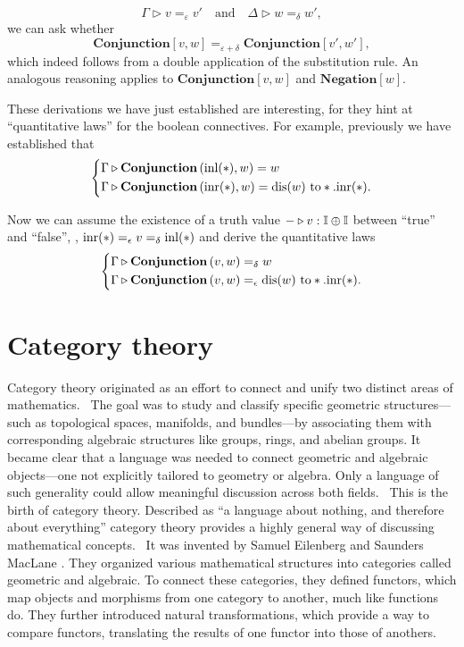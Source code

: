$$ \Gamma \triangleright v =_{\varepsilon} v' \quad \text{and} \quad \Delta \triangleright w =_{\delta} w', $$
we can ask whether
$$ \textbf{Conjunction} [v, w] =_{\varepsilon + \delta}  \textbf{Conjunction} [v', w'], $$
which indeed follows from a double application of the substitution rule. An analogous reasoning applies to $\textbf{Conjunction} [v, w]$ and $\textbf{Negation} [w]$.

These derivations we have just established are interesting, for they hint at ``quantitative laws'' for the boolean connectives. For example, previously we have established that
\[
      \left\{
      \begin{aligned}
      & \Gamma \triangleright \textbf{Conjunction} \, (\mathrm{inl}(*),w) = w  \\
      & \Gamma \triangleright \textbf{Conjunction} \, (\mathrm{inr}(*), w) = \text{dis}(w) \text{ to} *. \mathrm{inr}(*).
      \end{aligned}
      \right.
      \]

Now we can assume the existence of a truth value $- \triangleright v: \mathbb{I} \oplus \mathbb{I}$ between ``true'' and ``false'', \ie,
$\mathrm{inr}(*) =_{\epsilon} v  =_{\delta} \mathrm{inl}(*)$
and derive the quantitative laws
\[
      \left\{
      \begin{aligned}
      & \Gamma \triangleright \textbf{Conjunction} \, (v,w) =_{\delta} w  \\
      & \Gamma \triangleright \textbf{Conjunction} \, (v, w) =_{\epsilon} \text{dis}(w) \text{ to} *. \mathrm{inr}(*).
      \end{aligned}
      \right.
      \]

\section{Category theory} \label{sec:catgories}


Category theory originated as an effort to connect and unify two distinct areas of mathematics.  The goal was to study and classify specific geometric structures—such as topological spaces, manifolds, and bundles—by associating them with corresponding algebraic structures like groups, rings, and abelian groups. It became clear that a language was needed to connect geometric and algebraic objects—one not explicitly tailored to geometry or algebra. Only a language of such generality could allow meaningful discussion across both fields.  This is the birth of category theory.
Described as ``a language about nothing, and therefore about everything'' category theory provides a highly general way of discussing mathematical concepts.  It was invented by Samuel Eilenberg and Saunders MacLane \cite{eilenbergGeneralTheoryNatural1945}. They organized various mathematical structures into categories called geometric and algebraic. To connect these categories, they defined functors, which map objects and morphisms from one category to another, much like functions do. They further introduced natural transformations, which provide a way to compare functors, translating the results of one functor into those of anothers. \cite{yanofskyMonoidalCategoryTheory2024}

